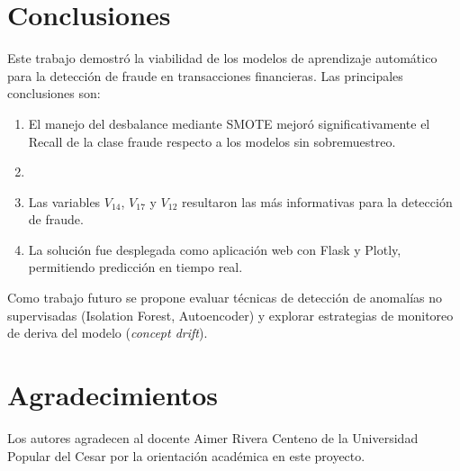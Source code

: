 \section{Conclusiones}

Este trabajo demostró la viabilidad de los modelos de aprendizaje automático
para la detección de fraude en transacciones financieras. Las principales
conclusiones son:

\begin{enumerate}
  \item El manejo del desbalance mediante SMOTE mejoró significativamente
        el Recall de la clase fraude respecto a los modelos sin sobremuestreo.
  \item [Completar con conclusión sobre el mejor modelo]
  \item Las variables $V_{14}$, $V_{17}$ y $V_{12}$ resultaron las más
        informativas para la detección de fraude.
  \item La solución fue desplegada como aplicación web con Flask y Plotly,
        permitiendo predicción en tiempo real.
\end{enumerate}

Como trabajo futuro se propone evaluar técnicas de detección de anomalías
no supervisadas (Isolation Forest, Autoencoder) y explorar estrategias de
monitoreo de deriva del modelo (\textit{concept drift}).

\section*{Agradecimientos}
Los autores agradecen al docente Aimer Rivera Centeno de la Universidad
Popular del Cesar por la orientación académica en este proyecto.
